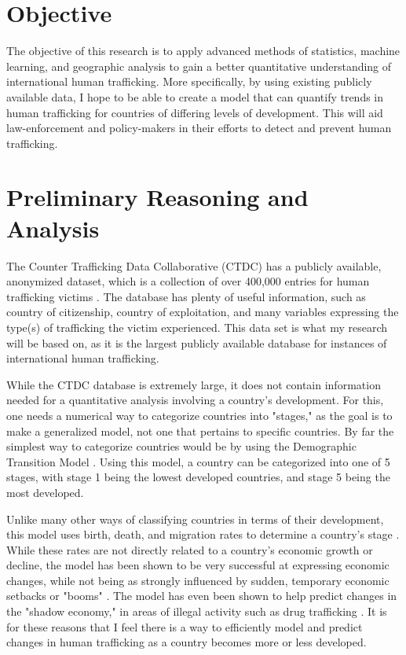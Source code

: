 \documentclass{article} %
\begin{document}
	
	
\section{Objective}

The objective of this research is to apply advanced methods of statistics, machine learning, and geographic analysis to gain a better quantitative understanding of international human trafficking. More specifically, by using existing publicly available data, I hope to be able to create a model that can quantify trends in human trafficking for countries of differing levels of development. This will aid law-enforcement and policy-makers in their efforts to detect and prevent human trafficking.


\section{Preliminary Reasoning and Analysis}

The Counter Trafficking Data Collaborative (CTDC) has a publicly available, anonymized dataset, which is a collection of over 400,000 entries for human trafficking victims \parencite{CTDC}. The database has plenty of useful information, such as country of citizenship, country of exploitation, and many variables expressing the type(s) of trafficking the victim experienced. This data set is what my research will be based on, as it is the largest publicly available database for instances of international human trafficking.

While the CTDC database is extremely large, it does not contain information needed for a quantitative analysis involving a country's development. For this, one needs a numerical way to categorize countries into "stages," as the goal is to make a generalized model, not one that pertains to specific countries. By far the simplest way to categorize countries would be by using the Demographic Transition Model \parencite{bongaarts2009}. Using this model, a country can be categorized into one of 5 stages, with stage 1 being the lowest developed countries, and stage 5 being the most developed.

Unlike many other ways of classifying countries in terms of their development, this model uses birth, death, and migration rates to determine a country's stage \parencite{bongaarts2009}. While these rates are not directly related to a country's economic growth or decline, the model has been shown to be very successful at expressing economic changes, while not being as strongly influenced by sudden, temporary economic setbacks or "booms" \parencite{kirk1996,bar2010,galor2000}. The model has even been shown to help predict changes in the "shadow economy," in areas of illegal activity such as drug trafficking \parencite{sch1994}. It is for these reasons that I feel there is a way to efficiently model and predict changes in human trafficking as a country becomes more or less developed.
\end{document}
